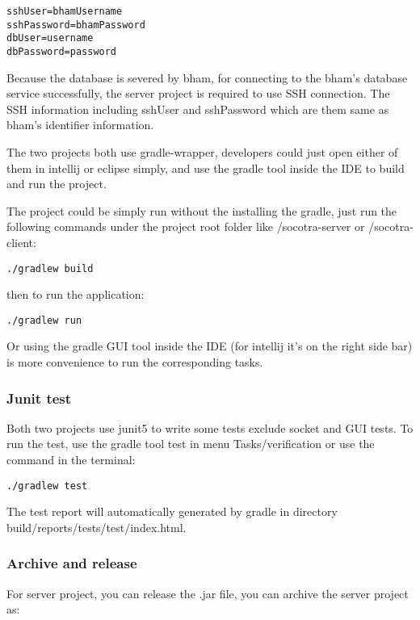 \begin{lstlisting}
sshUser=bhamUsername
sshPassword=bhamPassword
dbUser=username
dbPassword=password
\end{lstlisting}

Because the database is severed by bham, for connecting to the bham's database service successfully, the server project is required to use SSH connection. The SSH information including sshUser and sshPassword which are them same as bham's identifier information.

The two projects both use gradle-wrapper, developers could just open either of them in intellij or eclipse simply, and use the gradle tool inside the IDE to build and run the project.

The project could be simply run without the installing the gradle, just run the following commands under the project root folder like /socotra-server or /socotra-client:

\begin{lstlisting}
./gradlew build
\end{lstlisting}

then to run the application:

\begin{lstlisting}
./gradlew run
\end{lstlisting}

Or using the gradle GUI tool inside the IDE (for intellij it's on the right side bar) is more convenience to run the corresponding tasks.

\subsubsection{Junit test}

Both two projects use junit5 to write some tests exclude socket and GUI tests. To run the test, use the gradle tool test in menu Tasks/verification or use the command in the terminal:

\begin{lstlisting}
./gradlew test
\end{lstlisting}

The test report will automatically generated by gradle in directory build/reports/tests/test/index.html.

\subsubsection{Archive and release}

For server project, you can release the .jar file, you can archive the server project as:

